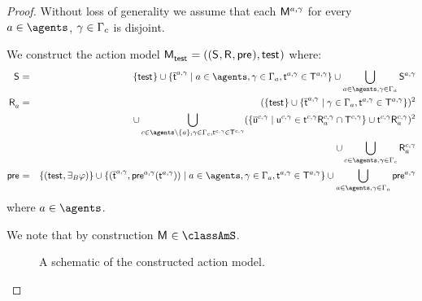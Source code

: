 \begin{proof}
Without loss of generality we assume that each $\aModel[\agentA, \gamma]$ for every $\agentA \in \agents$, $\gamma \in \Gamma_\agentC$ is disjoint.

We construct the action model $\aPModelAndTuple{\aStateTest}$ where:
\begin{eqnarray*}
    \aStates &=& \{\aStateTest\} \cup \{\aPStateT[\agentA, \gamma] \mid \agentA \in \agents, \gamma \in \Gamma_\agentA, \aStateT[\agentA, \gamma] \in \aStatesT[\agentA, \gamma]\} \cup \bigcup_{\agentA \in \agents, \gamma \in \Gamma_\agentA} \aStates[\agentA, \gamma]\\
    \aAccessibilityA &=& (\{\aStateTest\} \cup \{\aPStateT[\agentA, \gamma] \mid \gamma \in \Gamma_\agentA, \aStateT[\agentA, \gamma] \in \aStatesT[\agentA, \gamma]\})^2\\&&\quad \cup \bigcup_{\agentC \in \agents \setminus \{\agentA\}, \gamma \in \Gamma_\agentC, \aStateT[\agentC, \gamma] \in \aStatesT[\agentC, \gamma]} (\{\aPStateU[\agentC, \gamma] \mid \aStateU[\agentC, \gamma] \in \aSuccessorsA[\agentC, \gamma]{\aStateT[\agentC, \gamma]} \cap \aStatesT[\agentC, \gamma]\} \cup \aSuccessorsA[\agentC, \gamma]{\aStateT[\agentC, \gamma]})^2 \\&&\quad\cup \bigcup_{\agentC \in \agents, \gamma \in \Gamma_\agentC} \aAccessibilityA[\agentC, \gamma]\\
    \aPrecondition &=& \{(\aStateTest, \someactsBs \phi)\} \cup \{(\aPStateT[\agentA, \gamma], \aPrecondition[\agentA, \gamma](\aStateT[\agentA, \gamma])) \mid \agentA \in \agents, \gamma \in \Gamma_\agentA, \aStateT[\agentA, \gamma] \in \aStatesT[\agentA, \gamma]\} \cup \bigcup_{\agentA \in \agents, \gamma \in \Gamma_\agentA} \aPrecondition[\agentA, \gamma]
\end{eqnarray*}
where $\agentA \in \agents$.

We note that by construction $\aModel \in \classAmS$.

\begin{figure}
    \caption{A schematic of the constructed action model.}\label{aaml-s5-construction}
    \centering
\end{figure}
\end{proof}
